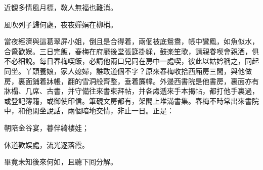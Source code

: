 \begin{myquote}
近覩多情風月標，敎人無福也難消。

風吹列子歸何處，夜夜嬋娟在柳梢。
\end{myquote}

當夜經濟與這葛翠屏小姐，倒且是合得着，兩個被底鴛鴦，帳中鸞鳳，如魚似水，合巹歡娱。三日完飯，春梅在府廳後堂張筵掛綵，鼓楽笙歌，請親眷喫會親酒，俱不必細說。每日春梅喫飯，必請他兩口兒同在房中一處喫，彼此以姑妗稱之，同起同坐。丫頭養娘，家人媳婦，誰敢道個不字？原來春梅收拾西廂房三間，與他做房，裏面鋪着牀帳，翻的雪洞般齊整，垂着簾幃。外邊西書院是他書房，裏面亦有牀榻、几席、古書，并守備往來書柬拜帖，并各䖏遞來手本揭帖，都打他手裏過，或登記簿籍，或御使印信。筆硯文房都有，架閣上堆滿書集。春梅不時常出來書院中，和他閑坐說話，兩個暗地交情，非止一日。正是：

\begin{myquote}
朝陪金谷宴，暮伴綺樓娃；

休道歡娱處，流光逐落霞。
\end{myquote}

畢竟未知後來何如，且聽下囘分解。

